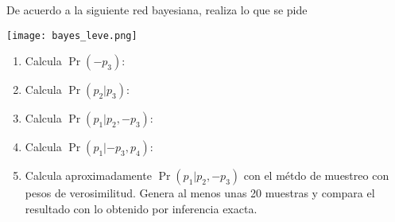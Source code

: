 \documentclass[onecolumn, letter, 11pt]{article}
\begin{document}
De acuerdo a la siguiente red bayesiana, realiza lo que se pide

\begin{center}
  \texttt{[image: bayes\_leve.png]}
\end{center}

\begin{enumerate}
\item Calcula $\Pr(-p_3)$:
\item Calcula $\Pr(p_2|p_3)$:
\item Calcula $\Pr(p_1|p_2, -p_3)$:
\item Calcula $\Pr(p_1|-p_3, p_4)$:
\item Calcula aproximadamente $\Pr(p_1|p_2, -p_3)$ con el métdo de
  muestreo con pesos de verosimilitud. Genera al menos unas 20
  muestras y compara el resultado con lo obtenido por inferencia
  exacta.
\end{enumerate}
\end{document}
